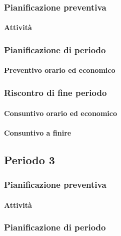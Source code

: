 \subsubsection{Pianificazione preventiva}

\paragraph{Attività}


\subsubsection{Pianificazione di periodo}



\paragraph{Preventivo orario ed economico}



\subsubsection{Riscontro di fine periodo}


\paragraph{Consuntivo orario ed economico}


\paragraph{Consuntivo a finire}






\subsection{Periodo 3}

\subsubsection{Pianificazione preventiva}

\paragraph{Attività}


\subsubsection{Pianificazione di periodo}



